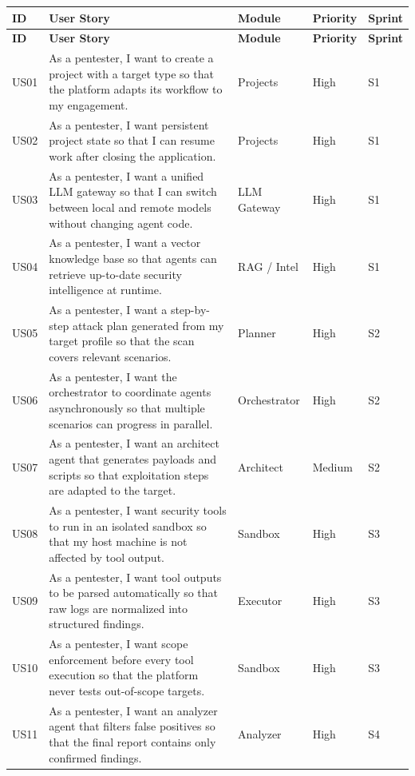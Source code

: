 \documentclass[12pt,a4paper]{report}
\begin{document}
\begin{longtable}{|p{}|p{}|p{}|p{}|p{}|}
\hline
\textbf{ID} & \textbf{User Story} & \textbf{Module} & \textbf{Priority} &
\textbf{Sprint} \\
\hline
\endfirsthead
\hline
\textbf{ID} & \textbf{User Story} & \textbf{Module} & \textbf{Priority} &
\textbf{Sprint} \\
\hline
\endhead
US01 & As a pentester, I want to create a project with a target type so that the
platform adapts its workflow to my engagement. & Projects & High & S1 \\
\hline
US02 & As a pentester, I want persistent project state so that I can resume work
after closing the application. & Projects & High & S1 \\
\hline
US03 & As a pentester, I want a unified LLM gateway so that I can switch between
local and remote models without changing agent code. & LLM Gateway & High & S1 \\
\hline
US04 & As a pentester, I want a vector knowledge base so that agents can retrieve
up-to-date security intelligence at runtime. & RAG / Intel & High & S1 \\
\hline
US05 & As a pentester, I want a step-by-step attack plan generated from my target
profile so that the scan covers relevant scenarios. & Planner & High & S2 \\
\hline
US06 & As a pentester, I want the orchestrator to coordinate agents asynchronously
so that multiple scenarios can progress in parallel. & Orchestrator & High & S2 \\
\hline
US07 & As a pentester, I want an architect agent that generates payloads and scripts
so that exploitation steps are adapted to the target. & Architect & Medium & S2 \\
\hline
US08 & As a pentester, I want security tools to run in an isolated sandbox so that
my host machine is not affected by tool output. & Sandbox & High & S3 \\
\hline
US09 & As a pentester, I want tool outputs to be parsed automatically so that raw
logs are normalized into structured findings. & Executor & High & S3 \\
\hline
US10 & As a pentester, I want scope enforcement before every tool execution so that
the platform never tests out-of-scope targets. & Sandbox & High & S3 \\
\hline
US11 & As a pentester, I want an analyzer agent that filters false positives so that
the final report contains only confirmed findings. & Analyzer & High & S4 \\

\end{longtable}
\end{document}
